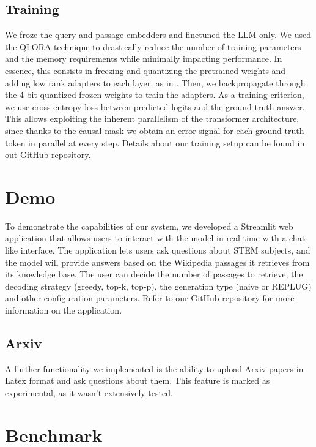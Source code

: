 \documentclass[11pt]{article}
\begin{document}
\subsection{Training}

We froze the query and passage embedders and finetuned the LLM only. We used the QLORA technique \cite{qlora} to drastically reduce the number of training
parameters and the memory requirements while minimally impacting performance. In essence, this consists in freezing and quantizing the pretrained weights and adding low
rank adapters to each layer, as in \cite{lora}. Then, we backpropagate through the 4-bit quantized frozen weights to train the adapters.
As a training criterion, we use cross entropy loss between predicted logits and the ground truth answer. This allows exploiting the inherent
parallelism of the transformer architecture, since thanks to the causal mask we obtain an error signal for each ground truth token in parallel at every step.
Details about our training setup can be found in out GitHub repository.

\section{Demo}

To demonstrate the capabilities of our system, we developed a Streamlit web application
that allows users to interact with the model in real-time with a chat-like interface. 
The application lets users ask questions about STEM subjects, and the model will provide answers 
based on the Wikipedia passages it retrieves from its knowledge base. 
The user can decide the number of passages to retrieve, the decoding strategy (greedy, top-k, top-p), 
the generation type (naive or REPLUG) and other configuration parameters.
Refer to our GitHub repository for more information on the application.

\subsection{Arxiv}

A further functionality we implemented is the ability to upload Arxiv papers in Latex format and ask questions about them.
This feature is marked as experimental, as it wasn't extensively tested.

\section{Benchmark}
\end{document}
